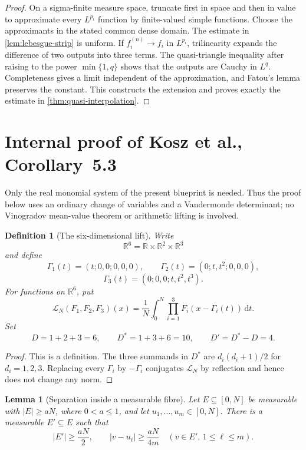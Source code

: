 \documentclass[11pt]{article}
\newtheorem{lemma}[theorem]{Lemma}
\newtheorem{definition}[theorem]{Definition}
\newcommand{\R}{\mathbb{R}}
\newcommand{\dd}{\,\mathrm{d}}
\newcommand{\abs}[1]{\left|#1\right|}
\begin{document}
	\begin{proof}
		On a sigma-finite measure space, truncate first in space and then in value to approximate every \(L^{p_i}\) function by finite-valued simple functions.  Choose the approximants in the stated common dense domain.  The estimate in \cref{lem:lebesgue-strip} is uniform.  If \(f_i^{(n)}\to f_i\) in \(L^{p_i}\), trilinearity expands the difference of two outputs into three terms.  The quasi-triangle inequality after raising to the power
		\(\min\{1,q\}\) shows that the outputs are Cauchy in \(L^q\).  Completeness gives a limit independent of the approximation, and Fatou's lemma preserves the constant.  This constructs the extension and proves exactly the estimate in \cref{thm:quasi-interpolation}.
	\end{proof}
	
	\section{Internal proof of Kosz et al., Corollary~5.3}\label{sec:internal-kosz-improving}
	
	Only the real monomial system of the present blueprint is needed.  Thus the proof below uses an ordinary change of variables and a Vandermonde determinant; no Vinogradov mean-value theorem or arithmetic lifting is involved.
	
	\begin{definition}[The six-dimensional lift]\label{def:real-lift}
		Write
		\[
		\R^6=\R\times\R^2\times\R^3
		\]
		and define
		\[
		\Gamma_1(t)=(t;0,0;0,0,0),\qquad
		\Gamma_2(t)=(0;t,t^2;0,0,0),
		\]
		\[
		\Gamma_3(t)=(0;0,0;t,t^2,t^3).
		\]
		For functions on \(\R^6\), put
		\[
		\mathcal L_N(F_1,F_2,F_3)(x)
		=
		\frac1N\int_0^N\prod_{i=1}^3F_i(x-\Gamma_i(t))\dd t.
		\]
		Set
		\[
		D=1+2+3=6,\qquad
		D^\ast=1+3+6=10,\qquad D'=D^\ast-D=4.
		\]
	\end{definition}
	
	\begin{proof}
		This is a definition.  The three summands in \(D^\ast\) are
		\(d_i(d_i+1)/2\) for \(d_i=1,2,3\).  Replacing every \(\Gamma_i\) by
		\(-\Gamma_i\) conjugates \(\mathcal L_N\) by reflection and hence does not change any norm.
	\end{proof}
	
	\begin{lemma}[Separation inside a measurable fibre]\label{lem:fibre-separation}
		Let \(E\subseteq[0,N]\) be measurable with \(\abs E\geq aN\), where \(0<a\leq1\), and let \(u_1,\ldots,u_m\in[0,N]\).  There is a measurable \(E'\subseteq E\) such that
		\[
		\abs{E'}\geq\frac{aN}{2},
		\qquad
		\abs{v-u_\ell}\geq\frac{aN}{4m}
		\quad(v\in E',\,1\leq\ell\leq m).
		\]
	\end{lemma}
	
\end{document}
